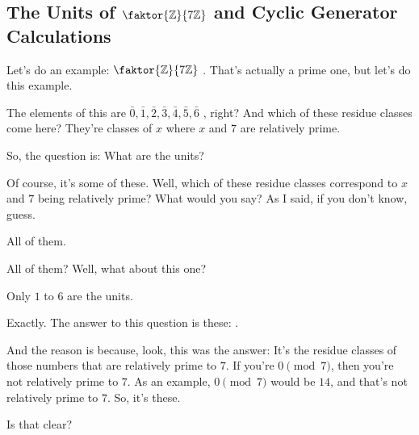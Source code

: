 \subsection{The Units of \texorpdfstring{$\faktor{\mathbb{Z}}{7\mathbb{Z}}$}{Z/7Z} and Cyclic Generator Calculations}

\begin{speech}[00:35:02 - 00:36:08]
Let's do an example: $\faktor{\mathbb{Z}}{7\mathbb{Z}}$ . That's actually a prime one, but let's do this example.

The elements of this are $\bar{0}, \bar{1}, \bar{2}, \bar{3}, \bar{4}, \bar{5}, \bar{6}$ , right? And which of these residue classes come here? They're classes of $x$ where $x$ and $7$ are relatively prime.

So, the question is: What are the units? 

Of course, it's some of these. Well, which of these residue classes correspond to $x$ and $7$ being relatively prime? What would you say? As I said, if you don't know, guess.
\end{speech}

\begin{student}
All of them.
\end{student}

\begin{speech}[00:36:11 - 00:36:14]
All of them? Well, what about this one? 
\end{speech}

\begin{student}
Only $1$ to $6$ are the units.
\end{student}

\begin{speech}[00:36:16 - 00:36:50]
Exactly. The answer to this question is these: .

And the reason is because, look, this was the answer: It's the residue classes of those numbers that are relatively prime to $7$. If you're $0 \pmod 7$, then you're not relatively prime to $7$. As an example, $0 \pmod 7$ would be $14$, and that's not relatively prime to $7$. So, it's these.

Is that clear?
\end{speech}

